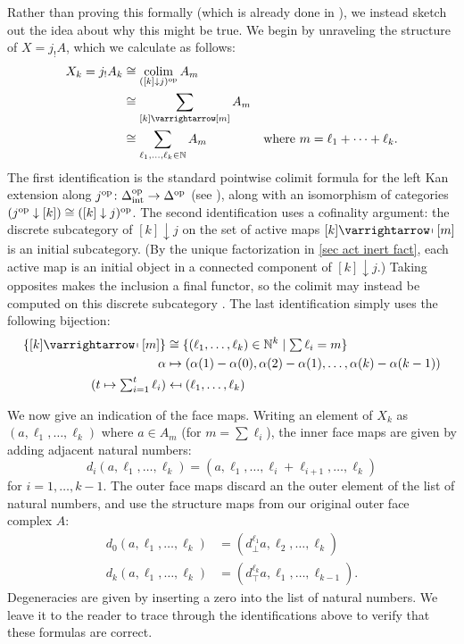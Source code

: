 \documentclass{amsart}
\theoremstyle{definition}
\theoremstyle{remark}
\newcommand{\op}{\textup{op}}
\newcommand{\intrm}{\textup{int}}
\newcommand{\delint}{\Delta_\intrm}
\DeclareMathOperator*{\colim}{colim}
\newcommand{\ract}{\varrightarrow\mapsfromchar}
\begin{document}
Rather than proving this formally (which is already done in \cite{HackneyKock:FDS}), we instead sketch out the idea about why this might be true.
We begin by unraveling the structure of $X = j_!A$, which we calculate as follows:
\begin{align*}
X_k = j_!A_k &\cong \colim_{([k] \downarrow j)^\op} A_m \\
&\cong\sum_{ [k] \ract [m]} A_m \\
&\cong \sum_{\ell_1, \dots, \ell_k \in \mathbb{N}} A_m & \text{where } m= \ell_1 + \dots + \ell_k.
\end{align*}
The first identification is the standard pointwise colimit formula for the left Kan extension along $j^\op \colon \delint^\op \to \Delta^\op$ (see \cite[X.3]{MacLane:CWM}), along with an isomorphism of categories $(j^\op \downarrow [k]) \cong ([k] \downarrow j)^\op$.
The second identification uses a cofinality argument: the discrete subcategory of $[k] \downarrow j$ on the set of active maps $[k] \ract [m]$ is an initial subcategory. (By the unique factorization in \cref{sec act inert fact}, each active map is an initial object in a connected component of $[k] \downarrow j$.)
Taking opposites makes the inclusion a final functor, so the colimit may instead be computed on this discrete subcategory \cite[IX.3]{MacLane:CWM}.
The last identification simply uses the following bijection:
\begin{align*}
\{ [k] \ract [m] \}  &\cong \{ (\ell_1, \dots, \ell_k) \in \mathbb{N}^k \mid \textstyle  \sum \ell_i = m \} \\
\alpha   &\mapsto (\alpha(1) - \alpha(0), \alpha(2) - \alpha(1), \dots, \alpha(k) - \alpha(k-1)) \\
\textstyle  ( t \mapsto \sum_{i=1}^t \ell_i ) &\mapsfrom (\ell_1, \dots, \ell_k) 
\end{align*}

We now give an indication of the face maps.
Writing an element of $X_k$ as $(a, \ell_1, \dots, \ell_k)$ where $a\in A_m$ (for $m = \sum \ell_i$), the inner face maps are given by adding adjacent natural numbers:
\[
  d_i(a, \ell_1, \dots, \ell_k) = (a, \ell_1, \dots, \ell_i + \ell_{i+1}, \dots, \ell_k) 
\]
for $i=1, \dots, k-1$.
The outer face maps discard an the outer element of the list of natural numbers, and use the structure maps from our original outer face complex $A$:
\begin{align*}
  d_0(a, \ell_1, \dots, \ell_k) &= (d_\bot^{\ell_1} a, \ell_2, \dots, \ell_k) \\
  d_k(a, \ell_1, \dots, \ell_k) &= (d_\top^{\ell_k} a, \ell_1, \dots, \ell_{k-1}).
\end{align*}
Degeneracies are given by inserting a zero into the list of natural numbers.
We leave it to the reader to trace through the identifications above to verify that these formulas are correct.
\end{document}

